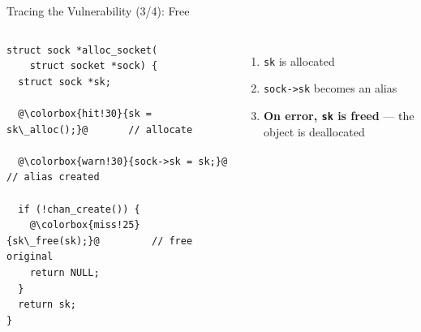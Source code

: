 \documentclass[aspectratio=169,10pt]{beamer}
\begin{document}
\begin{frame}[fragile]{Tracing the Vulnerability (3/4): Free}
  \begin{columns}
    \begin{tcolorbox}[colback=c1!3, colframe=c1!40!black, boxrule=0.5pt,
      left=4pt, right=4pt, top=4pt, bottom=4pt, arc=3pt,
      shadow={0.5mm}{-0.5mm}{0mm}{black!15}]
    \begin{lstlisting}[style=ccode, basicstyle=\ttfamily\scriptsize\color{black!80},
      keywordstyle=\color{c4}\bfseries, commentstyle=\color{c1!70!black}\itshape,
      stringstyle=\color{c6}, escapechar=@]
struct sock *alloc_socket(
    struct socket *sock) {
  struct sock *sk;

  @\colorbox{hit!30}{sk = sk\_alloc();}@       // allocate

  @\colorbox{warn!30}{sock->sk = sk;}@         // alias created

  if (!chan_create()) {
    @\colorbox{miss!25}{sk\_free(sk);}@         // free original
    return NULL;
  }
  return sk;
}
    \end{lstlisting}
    \end{tcolorbox}

    \begin{enumerate}
      \item[\faCheckCircle] \texttt{sk} is allocated
      \item[\faCheckCircle] \texttt{sock->sk} becomes an alias
      \item[\faCheckCircle] \textbf{On error, \texttt{sk} is freed} — the object is deallocated
    \end{enumerate}
  \end{columns}
\end{frame}
\end{document}
